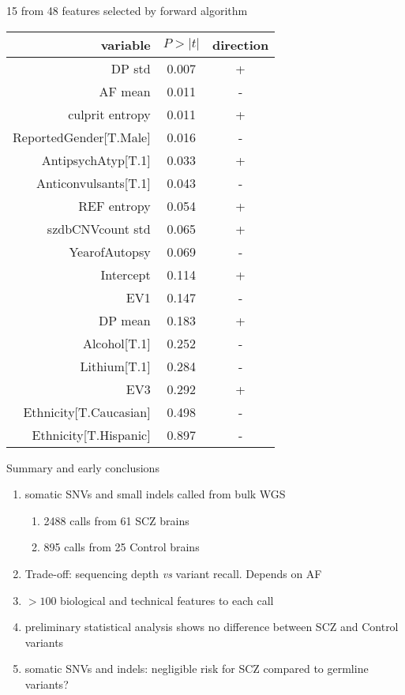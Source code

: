 \documentclass[usenames,dvipsnames]{beamer}
\begin{document}
\begin{frame}{15 from 48 features selected by forward algorithm}
\tiny
\begin{tabular}{rcc}
	variable & \(P>|t|\) & direction \\
\hline
DP std & 0.007 & + \\
AF mean & 0.011 & - \\
culprit entropy & 0.011 & + \\
ReportedGender[T.Male] & 0.016 & - \\
AntipsychAtyp[T.1] & 0.033 & + \\
Anticonvulsants[T.1] & 0.043 & - \\
REF entropy & 0.054 & + \\
szdbCNVcount std & 0.065 & + \\
YearofAutopsy & 0.069 & - \\
Intercept & 0.114 & + \\
EV1 & 0.147 & - \\
DP mean & 0.183 & + \\
Alcohol[T.1] & 0.252 & - \\
Lithium[T.1] & 0.284 & - \\
EV3 & 0.292 & + \\
Ethnicity[T.Caucasian] & 0.498 & - \\
Ethnicity[T.Hispanic] & 0.897 & - \\
\end{tabular}
\end{frame}

\begin{frame}{Summary and early conclusions}
\begin{enumerate}
\item somatic SNVs and small indels called from bulk WGS 
\begin{enumerate}
\item 2488 calls from 61 SCZ brains
\item 895 calls from 25 Control brains
\end{enumerate}
\item Trade-off: sequencing depth \emph{vs} variant recall. Depends on AF
\item \(> 100\) biological and technical features to each call
\item preliminary statistical analysis shows no difference between SCZ and Control variants
\item somatic SNVs and indels: negligible risk for SCZ compared to germline variants?
\end{enumerate}
\end{frame}
\end{document}
